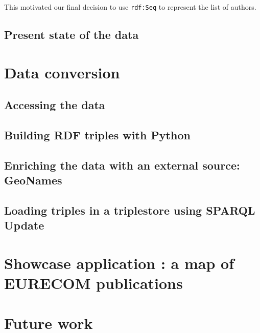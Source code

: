 \documentclass[a4paper,11pt]{report}
\begin{document}
This motivated our final decision to use \texttt{rdf:Seq} to represent the list of authors. 
\section{Present state of the data}



\chapter{Data conversion}
\section{Accessing the data} 
\section{Building RDF triples with Python}
\section{Enriching the data with an external source: GeoNames}
\section{Loading triples in a triplestore using SPARQL Update}



\chapter{Showcase application : a map of EURECOM publications}



\chapter{Future work}

\end{document}
